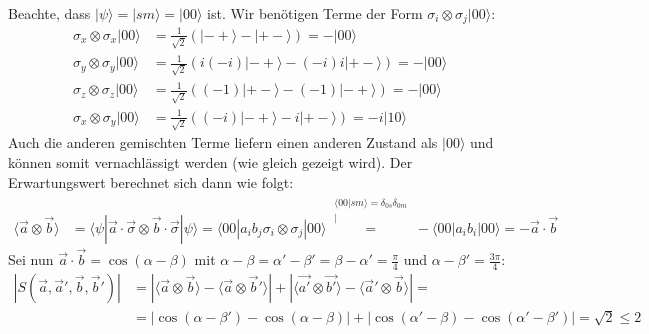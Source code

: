 \documentclass[a4paper,12pt]{article}
\newcommand{\bra}{}
\newcommand{\kom}{}
\newcommand{\brak}{}
\newcommand{\braket}{}
\newcommand{\kla}{}
\newcommand{\Ket}{}
\begin{document}
Beachte, dass $\Ket | {\psi} \rangle=\Ket | {sm} \rangle=\Ket | {00} \rangle$ ist. Wir benötigen Terme der Form $\sigma_i\otimes\sigma_j\Ket | {00} \rangle$:
\begin{align*}
\sigma_x\otimes\sigma_x\Ket | {00} \rangle&=\frac{1}{\sqrt{2}}\kla\left( {\Ket | {-+} \rangle-\Ket | {+-} \rangle} \right)=-\Ket | {00} \rangle\\
\sigma_y\otimes\sigma_y\Ket | {00} \rangle&=\frac{1}{\sqrt{2}}\kla\left( {i(-i)\Ket | {-+} \rangle-(-i)i\Ket | {+-} \rangle} \right)=-\Ket | {00} \rangle\\
\sigma_z\otimes\sigma_z\Ket | {00} \rangle&=\frac{1}{\sqrt{2}}\kla\left( {(-1)\Ket | {+-} \rangle-(-1)\Ket | {-+} \rangle} \right)=-\Ket | {00} \rangle\\
\sigma_x\otimes\sigma_y\Ket | {00} \rangle&=\frac{1}{\sqrt{2}}\kla\left( {(-i)\Ket | {-+} \rangle-i\Ket | {+-} \rangle} \right)=-i\Ket | {10} \rangle
\end{align*}
Auch die anderen gemischten Terme liefern einen anderen Zustand als $\Ket | {00} \rangle$ und können somit vernachlässigt werden (wie gleich gezeigt wird). Der Erwartungswert berechnet sich dann wie folgt:
\begin{align*}
\bra\langle {\vec{a}\otimes\vec{b}}\rangle&=\braket\langle {\psi} | {\vec{a}\cdot\vec{\sigma}\otimes\vec{b}\cdot\vec{\sigma}} | {\psi}\rangle=\braket\langle {00} | {a_i b_j\sigma_i\otimes\sigma_j} | {00}\rangle\kom\overset{\substack{{\brak\langle {00}| {sm}\rangle=\delta_{0s}\delta_{0m}} \\ |}}{=}-\braket\langle {00} | {a_ib_i} | {00}\rangle=-\vec{a}\cdot\vec{b}
\end{align*}
Sei nun $\vec{a}\cdot\vec{b}=\cos\kla\left( {\alpha-\beta} \right)$ mit $\alpha-\beta=\alpha'-\beta'=\beta-\alpha'=\frac{\pi}{4}$ und $\alpha-\beta'=\frac{3\pi}{4}$:
\begin{align*}
|S(\vec{a},\vec{a}',\vec{b},\vec{b}')|&=|\bra\langle \vec{a}\otimes\vec{b}\rangle-\langle\vec{a}\otimes\vec{b}'\rangle|+|\langle\vec{a'}\otimes\vec{b'}\rangle-\langle\vec{a}'\otimes\vec{b}\rangle|=\\
&=|\cos\kla\left( {\alpha-\beta'} \right)-\cos\kla\left( {\alpha-\beta} \right)|+|\cos\kla\left( {\alpha'-\beta} \right)-\cos\kla\left( {\alpha'-\beta'} \right)|=\sqrt{2}\le 2
\end{align*}
\end{document}
